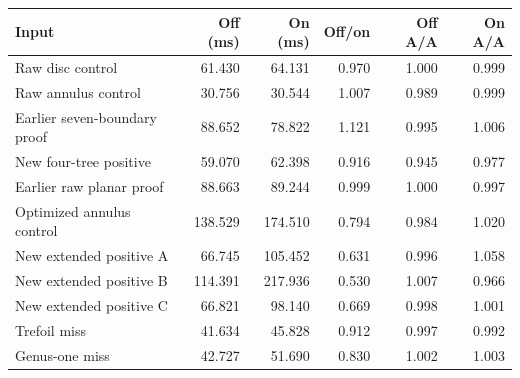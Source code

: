 \begin{tabular}{lrrrrr}
\toprule
Input & Off (ms) & On (ms) & Off/on & Off A/A & On A/A \\
\midrule
Raw disc control & 61.430 & 64.131 & 0.970 & 1.000 & 0.999 \\
Raw annulus control & 30.756 & 30.544 & 1.007 & 0.989 & 0.999 \\
Earlier seven-boundary proof & 88.652 & 78.822 & 1.121 & 0.995 & 1.006 \\
New four-tree positive & 59.070 & 62.398 & 0.916 & 0.945 & 0.977 \\
Earlier raw planar proof & 88.663 & 89.244 & 0.999 & 1.000 & 0.997 \\
Optimized annulus control & 138.529 & 174.510 & 0.794 & 0.984 & 1.020 \\
New extended positive A & 66.745 & 105.452 & 0.631 & 0.996 & 1.058 \\
New extended positive B & 114.391 & 217.936 & 0.530 & 1.007 & 0.966 \\
New extended positive C & 66.821 & 98.140 & 0.669 & 0.998 & 1.001 \\
Trefoil miss & 41.634 & 45.828 & 0.912 & 0.997 & 0.992 \\
Genus-one miss & 42.727 & 51.690 & 0.830 & 1.002 & 1.003 \\
\bottomrule
\end{tabular}
